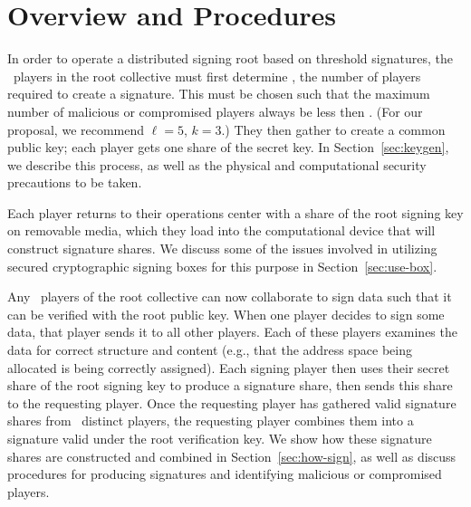 \section{Overview and Procedures}
\label{sec:overview}


In order to operate a distributed signing root based on threshold
signatures, the \nump\ players in the root collective must first
determine \nums, the number of players required to create a
signature. This must be chosen such that the maximum number of
malicious or compromised players always be less then \nums. (For our
proposal, we recommend $\ell=5$, $k=3$.) They then gather to create a
common public key; each player gets one share of the secret key. In
Section~\ref{sec:keygen}, we describe this process, as well as the
physical and computational security precautions to be taken.

Each player returns to their operations center with a share of the
root signing key on removable media, which they load into the
computational device that will construct signature shares. We discuss
some of the issues involved in utilizing secured cryptographic signing
boxes for this purpose in Section~\ref{sec:use-box}.

Any \nums\ players of the root collective can now collaborate to sign
data such that it can be verified with the root public key. When one
player decides to sign some data, that player sends it to all other
players. Each of these players examines the data for correct structure
and content (e.g., that the address space being allocated is being
correctly assigned). Each signing player then uses their secret share
of the root signing key to produce a signature share, then sends this
share to the requesting player. Once the requesting player has
gathered valid signature shares from \nums\ distinct players, the
requesting player combines them into a signature valid under the root
verification key. We show how these signature shares are constructed
and combined in Section~\ref{sec:how-sign}, as well as discuss
procedures for producing signatures and identifying malicious or
compromised players.


